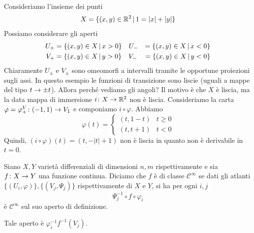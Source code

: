 \documentclass[a4paper]{article}
\begin{document}
\begin{snippetexample}{}
\begin{figure}
\begin{center}
        \end{center}
    \end{figure}
    Consideriamo l'insieme dei punti
    \[
        X = \{(x,y) \in \mathbb{R}^2 \,|\, 1 = |x| + |y|\}
    \]
    Possiamo considerare gli aperti
    \begin{align*}
        U_+ &= \{(x,y) \in X \,|\, x>0\} \quad U_- &= \{(x,y) \in X \,|\, x<0\} \\
        V_+ &= \{(x,y) \in X \,|\, y>0\} \quad V_- &= \{(x,y) \in X \,|\, y<0\}
    \end{align*}
    Chiaramente \(U_{\pm}\) e \(V_{\pm}\) sono omeomorfi a intervalli tramite le opportune proiezioni sugli assi.
    In questo esempio le funzioni di transizione sono liscie (uguali a mappe del tipo \(t \to \pm t\)).
    Allora perché vediamo gli angoli? Il motivo è che \(X\) è liscia, ma la data mappa di immersione
    \(i \colon X \to \mathbb{R}^2\) non è liscia.
    Consideriamo la carta \(\varphi = \varphi^V_+ \colon (-1,1) \to V_1\)
    e componiamo \(i \circ \varphi\). Abbiamo
    \[
        \varphi(t) = \begin{cases}
            (t,1-t) & t \geq 0 \\
            (t,t+1) & t < 0
        \end{cases}
    \]
    Quindi, \((i \circ \varphi)(t) = (t, -|t| + 1)\) non è liscia
    in quanto non è derivabile in \(t=0\).
    \wrapfill
\end{snippetexample}

\begin{snippetdefinition}{}
    Siano \(X,Y\) varietà differenziali di dimensioni \(n,m\)
    rispettivamente e sia \(f \colon X \to Y\) una funzione continua.
    Diciamo che \(f\) è di classe \(\mathcal C^\infty\) se
    dati gli atlanti \(\{(U_i, \varphi)\}, \{(V_j, \Psi_j)\}\)
    rispettivamente di \(X\) e \(Y\), si ha per ogni \(i,j\)
    \[
        \Psi_j^{-1} \circ f \circ \varphi_i
    \]
    è \(\mathcal C^\infty\) sul suo aperto di definizione.
\end{snippetdefinition}

Tale aperto è \(\varphi_i^{-1} f^{-1}(V_j)\).
\end{document}
